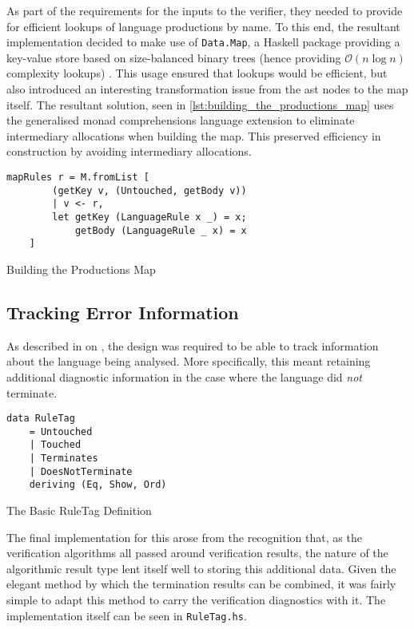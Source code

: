 As part of the requirements for the inputs to the verifier, they needed to provide for efficient lookups of language productions by name. 
To this end, the resultant implementation decided to make use of \texttt{Data.Map}, a Haskell package providing a key-value store based on size-balanced binary trees (hence providing $\mathcal{O}(n \log n)$ complexity lookups) \citep{data_map}.
This usage ensured that lookups would be efficient, but also introduced an interesting transformation issue from the \gls{ast} nodes to the map itself.
The resultant solution, seen in \autoref{lst:building_the_productions_map} uses the generalised monad comprehensions language extension to eliminate intermediary allocations when building the map. 
This preserved efficiency in construction by avoiding intermediary allocations.

\begin{listing}[!htb]
\begin{verbatim}
mapRules r = M.fromList [
        (getKey v, (Untouched, getBody v))
        | v <- r,
        let getKey (LanguageRule x _) = x;
            getBody (LanguageRule _ x) = x
    ]
\end{verbatim}
\caption{Building the Productions Map}
\label{lst:building_the_productions_map}
\end{listing} 


\subsection{Tracking Error Information} %
\label{sub:tracking_error_information}
As described in  on , the design was required to be able to track information about the language being analysed.
More specifically, this meant retaining additional diagnostic information in the case where the language did \textit{not} terminate.

\begin{listing}[!htb]
\begin{verbatim}
data RuleTag
    = Untouched
    | Touched
    | Terminates
    | DoesNotTerminate
    deriving (Eq, Show, Ord)
\end{verbatim}
\caption{The Basic RuleTag Definition}
\label{lst:the_basic_ruletag_definition}
\end{listing}

The final implementation for this arose from the recognition that, as the verification algorithms all passed around verification results, the nature of the algorithmic result type lent itself well to storing this additional data. 
Given the elegant method by which the termination results can be combined, it was fairly simple to adapt this method to carry the verification diagnostics with it.
The implementation itself can be seen in \texttt{RuleTag.hs}.

